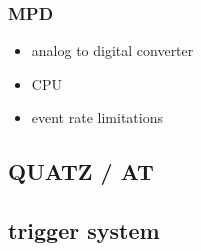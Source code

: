 \subsubsection{MPD}

\begin{itemize}
    \item analog to digital converter
    \item CPU 
    \item event rate limitations
\end{itemize}



\subsection{QUATZ / AT}
\subsection{trigger system}

